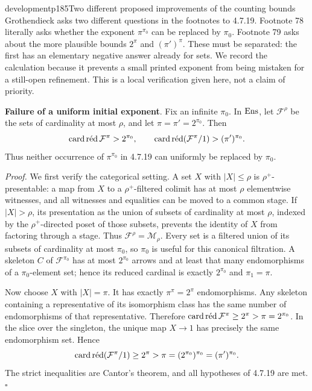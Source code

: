

\begin{dcomment}{development}{p185}{Two different proposed improvements of the counting bounds}
Grothendieck asks two different questions in the footnotes to 4.7.19. Footnote 78 literally asks whether the exponent $\pi^{\pi_0}$ can be replaced by $\pi_0$. Footnote 79 asks about the more plausible bounds $2^\pi$ and $(\pi')^\pi$. These must be separated: the first has an elementary negative answer already for sets. We record the calculation because it prevents a small printed exponent from being mistaken for a still-open refinement. This is a local verification given here, not a claim of priority.

\textbf{Failure of a uniform initial exponent}\ours.
Fix an infinite $\pi_0$. In $\Ens$, let $\mathcal F^\rho$ be the sets of cardinality at most $\rho$, and let $\pi=\pi'=2^{\pi_0}$. Then
\[
 \cardred\mathcal F^\pi>2^{\pi_0},
 \qquad
 \cardred(\mathcal F^\pi/1)>(\pi')^{\pi_0}.
\]
Thus neither occurrence of $\pi^{\pi_0}$ in 4.7.19 can uniformly be replaced by $\pi_0$.

\textit{Proof.} We first verify the categorical setting. A set $X$ with $|X|\leq\rho$ is $\rho^+$-presentable: a map from $X$ to a $\rho^+$-filtered colimit has at most $\rho$ elementwise witnesses, and all witnesses and equalities can be moved to a common stage. If $|X|>\rho$, its presentation as the union of subsets of cardinality at most $\rho$, indexed by the $\rho^+$-directed poset of those subsets, prevents the identity of $X$ from factoring through a stage. Thus $\mathcal F^\rho=\mathcal M_\rho$. Every set is a filtered union of its subsets of cardinality at most $\pi_0$, so $\pi_0$ is useful for this canonical filtration. A skeleton $C$ of $\mathcal F^{\pi_0}$ has at most $2^{\pi_0}$ arrows and at least that many endomorphisms of a $\pi_0$-element set; hence its reduced cardinal is exactly $2^{\pi_0}$ and $\pi_1=\pi$.

Now choose $X$ with $|X|=\pi$. It has exactly $\pi^\pi=2^\pi$ endomorphisms. Any skeleton containing a representative of its isomorphism class has the same number of endomorphisms of that representative. Therefore $\cardred\mathcal F^\pi\geq2^\pi>\pi=2^{\pi_0}$. In the slice over the singleton, the unique map $X\to1$ has precisely the same endomorphism set. Hence
\[
 \cardred(\mathcal F^\pi/1)\geq2^\pi
 >\pi=(2^{\pi_0})^{\pi_0}=(\pi')^{\pi_0}.
\]
The strict inequalities are Cantor's theorem, and all hypotheses of 4.7.19 are met.\hfill$\square$


\end{dcomment}
